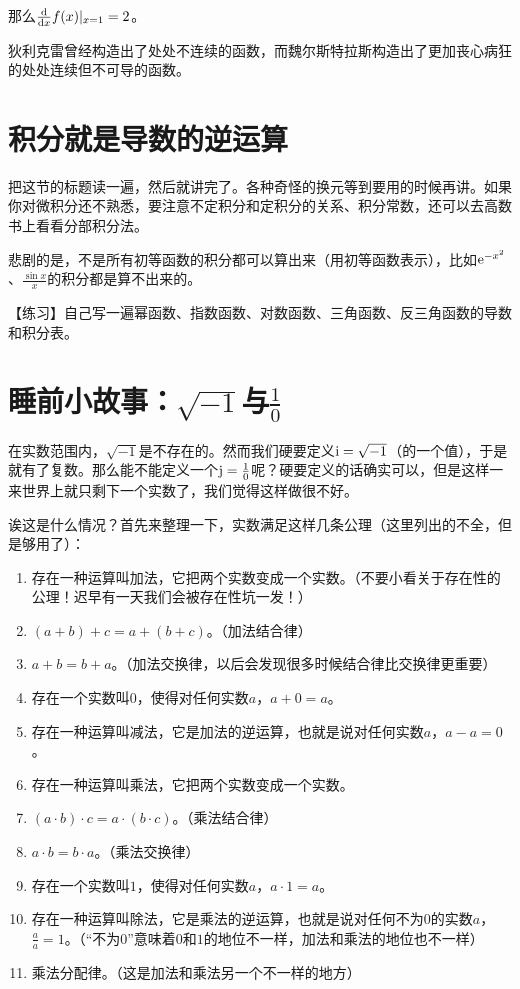那么$\frac{\mathop{}\!\mathrm{d}}{\mathop{}\!\mathrm{d} x} f(x)|_{x=1}=2$。

狄利克雷曾经构造出了处处不连续的函数，而魏尔斯特拉斯构造出了更加丧心病狂的处处连续但不可导的函数。
\section{积分就是导数的逆运算}
把这节的标题读一遍，然后就讲完了。各种奇怪的换元等到要用的时候再讲。如果你对微积分还不熟悉，要注意不定积分和定积分的关系、积分常数，还可以去高数书上看看分部积分法。

悲剧的是，不是所有初等函数的积分都可以算出来（用初等函数表示），比如$\mathrm{e}^{-x^2}$、$\frac{\sin x}{x}$的积分都是算不出来的。

【练习】自己写一遍幂函数、指数函数、对数函数、三角函数、反三角函数的导数和积分表。
\section{睡前小故事：$\sqrt{-1}$与$\frac{1}{0}$}
在实数范围内，$\sqrt{-1}$是不存在的。然而我们硬要定义$\mathrm{i}=\sqrt{-1}$（的一个值），于是就有了复数。那么能不能定义一个$\mathrm{j}=\frac{1}{0}$呢？硬要定义的话确实可以，但是这样一来世界上就只剩下一个实数了，我们觉得这样做很不好。

诶这是什么情况？首先来整理一下，实数满足这样几条公理（这里列出的不全，但是够用了）：
\begin{enumerate}
\item 存在一种运算叫加法，它把两个实数变成一个实数。（不要小看关于存在性的公理！迟早有一天我们会被存在性坑一发！）
\item $(a+b)+c=a+(b+c)$。（加法结合律）
\item $a+b=b+a$。（加法交换律，以后会发现很多时候结合律比交换律更重要）
\item 存在一个实数叫$0$，使得对任何实数$a$，$a+0=a$。
\item 存在一种运算叫减法，它是加法的逆运算，也就是说对任何实数$a$，$a-a=0$。
\item 存在一种运算叫乘法，它把两个实数变成一个实数。
\item $(a \cdot b) \cdot c=a \cdot (b \cdot c)$。（乘法结合律）
\item $a \cdot b=b \cdot a$。（乘法交换律）
\item 存在一个实数叫$1$，使得对任何实数$a$，$a \cdot 1=a$。
\item 存在一种运算叫除法，它是乘法的逆运算，也就是说对任何不为$0$的实数$a$，$\frac{a}{a}=1$。（“不为$0$”意味着$0$和$1$的地位不一样，加法和乘法的地位也不一样）
\item 乘法分配律。（这是加法和乘法另一个不一样的地方）
\end{enumerate}

